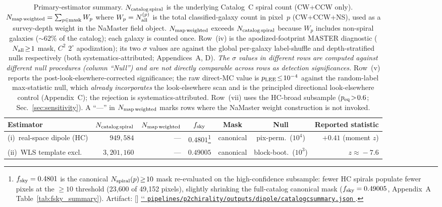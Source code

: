 \documentclass[aps,prd,twocolumn,superscriptaddress,preprintnumbers,nofootinbib,longbibliography,floatfix]{revtex4-2}
\makeatletter
\newcommand{\artbreak@us}{\discretionary{\char`\_}{}{\char`\_}}
\DeclareRobustCommand{\artifact}[1]{%
 \StrSubstitute{#1}{\_}{_}[\art@urlpath]%
 \href{https://github.com/Hubify-Projects/bigbounce/blob/main/\art@urlpath}{%
 \begingroup
 \let\_\artbreak@us
 \texttt{#1}%
 \endgroup
 }%
}
\makeatother
\begin{document}
\begin{table}[t]
\caption{\label{tab:headline_summary}Primary-estimator summary. $N_{\rm catalog\,spiral}$ is the underlying Catalog~C spiral count (CW+CCW only). $N_{\rm map\,weighted} = \sum_{p\in\rm mask} W_p$ where $W_p = N_{\rm all}^{(p)}$ is the total classified-galaxy count in pixel~$p$ (CW+CCW+NS), used as a survey-depth weight in the NaMaster field object. $N_{\rm map\,weighted}$ exceeds $N_{\rm catalog\,spiral}$ because $W_p$ includes non-spiral galaxies (${\sim}62\%$ of the catalog); each galaxy is counted once. Row~(iv) is the apodized-footprint MASTER diagnostic ($N_{\rm all}\!\geq\!1$ mask, $C^2$ $2^\circ$ apodization); its two $\sigma$ values are against the global per-galaxy label-shuffle and depth-stratified nulls respectively (both systematics-attributed; Appendices~A, D). \emph{The $\sigma$ values in different rows are computed against different null procedures (column ``Null'') and are not directly comparable across rows as detection significances.} Row~(v) reports the post-look-elsewhere-corrected significance; the raw direct-MC value is $p_{\rm LEE}\!\le\!10^{-4}$ against the random-label max-statistic null, which \emph{already incorporates} the look-elsewhere scan and is the principled directional look-elsewhere control (Appendix~C); the rejection is systematics-attributed. Row~(vii) uses the HC-broad subsample ($p_{\rm eq}\!>\!0.6$; Sec.~\ref{sec:sensitivity}). A ``---'' in $N_{\rm map\,weighted}$ marks rows where the NaMaster weight construction is not invoked.}
\begin{ruledtabular}
\begin{tabular}{lrrcccr}
\textbf{Estimator} & $N_{\rm catalog\,spiral}$ & $N_{\rm map\,weighted}$ & $f_{\rm sky}$ & \textbf{Mask} & \textbf{Null} & \textbf{Reported statistic} \\
\hline
(i)~real-space dipole (HC) & $949{,}584$ & --- & $0.4801$\footnote{$f_{\rm sky}=0.4801$ is the canonical $N_{\rm spiral}(p)\!\ge\!10$ mask re-evaluated on the high-confidence subsample: fewer HC spirals populate fewer pixels at the $\ge\!10$ threshold (23{,}600 of 49{,}152 pixels), slightly shrinking the full-catalog canonical mask ($f_{\rm sky}=0.49005$, Appendix~A Table~\ref{tab:fsky_summary}). Artifact: \artifact{pipelines/p2\_chirality/outputs/dipole/catalog\_c\_summary.json}.} & canonical & pix-perm.\ ($10^4$) & $+0.41$ (moment $z$) \\
(ii)~WLS template excl. & $3{,}201{,}160$ & --- & $0.49005$ & canonical & block-boot.\ ($10^3$) & $z\!\approx\!-7.6$ \\

\end{tabular}
\end{ruledtabular}
\end{table}
\end{document}
